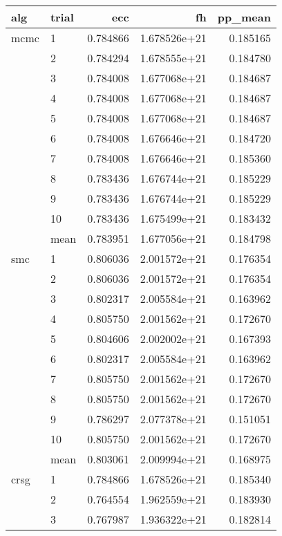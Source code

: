 \begingroup
\renewcommand{\arraystretch}{0.5}
\begin{tabular}{llrrr}
    \toprule     
    alg & trial & ecc & fh & pp\_mean \\
    \midrule
    mcmc & 1 &  0.784866 &  1.678526e+21 &  0.185165 \\
        & 2 &  0.784294 &  1.678555e+21 &  0.184780 \\
        & 3 &  0.784008 &  1.677068e+21 &  0.184687 \\
        & 4 &  0.784008 &  1.677068e+21 &  0.184687 \\
        & 5 &  0.784008 &  1.677068e+21 &  0.184687 \\
        & 6 &  0.784008 &  1.676646e+21 &  0.184720 \\
        & 7 &  0.784008 &  1.676646e+21 &  0.185360 \\
        & 8 &  0.783436 &  1.676744e+21 &  0.185229 \\
        & 9 &  0.783436 &  1.676744e+21 &  0.185229 \\
        & 10 &  0.783436 &  1.675499e+21 &  0.183432 \\
        \midrule
        & mean &  0.783951 &  1.677056e+21 &  0.184798 \\
    \midrule
    smc & 1 &  0.806036 &  2.001572e+21 &  0.176354 \\
        & 2 &  0.806036 &  2.001572e+21 &  0.176354 \\
        & 3 &  0.802317 &  2.005584e+21 &  0.163962 \\
        & 4 &  0.805750 &  2.001562e+21 &  0.172670 \\
        & 5 &  0.804606 &  2.002002e+21 &  0.167393 \\
        & 6 &  0.802317 &  2.005584e+21 &  0.163962 \\
        & 7 &  0.805750 &  2.001562e+21 &  0.172670 \\
        & 8 &  0.805750 &  2.001562e+21 &  0.172670 \\
        & 9 &  0.786297 &  2.077378e+21 &  0.151051 \\
        & 10 &  0.805750 &  2.001562e+21 &  0.172670 \\
        \midrule
        & mean &  0.803061 &  2.009994e+21 &  0.168975 \\
    \midrule
    crsg & 1 &  0.784866 &  1.678526e+21 &  0.185340 \\
        & 2 &  0.764554 &  1.962559e+21 &  0.183930 \\
        & 3 &  0.767987 &  1.936322e+21 &  0.182814 \\

\end{tabular}
